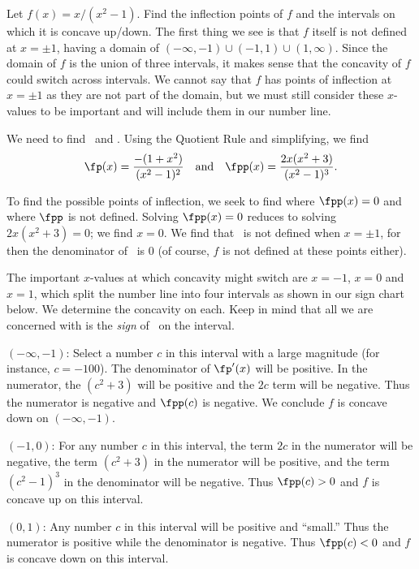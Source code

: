 \begin{example}\label{ex_conc2}
Let $f(x)=x/(x^2-1)$. Find the inflection points of $f$ and the intervals on which it is concave up/down.
\solution
The first thing we see is that $f$ itself is not defined at $x=\pm1$, having a domain of $(-\infty,-1)\cup(-1,1)\cup(1,\infty)$. Since the domain of $f$ is the union of three intervals, it makes sense that the concavity of $f$ could switch across intervals. We cannot say that $f$ has points of inflection at $x=\pm1$ as they are not part of the domain, but we must still consider these $x$-values to be important and will include them in our number line.

We need to find \fp\ and \fpp. Using the Quotient Rule and simplifying, we find
\[
\fp(x)=\frac{-(1+x^2)}{(x^2-1)^2}
\quad \text{and}\quad
\fpp(x) = \frac{2x(x^2+3)}{(x^2-1)^3}.
\]

To find the possible points of inflection, we seek to find where $\fpp(x)=0$ and where $\fpp$ is not defined. Solving $\fpp(x)=0$ reduces to solving $2x(x^2+3)=0$; we find $x=0$.  We find that \fpp\ is not defined when $x=\pm 1$, for then the denominator of \fpp\ is 0 (of course, $f$ is not defined at these points either).

The important $x$-values at which concavity might switch are $x=-1$, $x=0$ and $x=1$, which  split the number line into four intervals as shown in our sign chart below. We determine the concavity on each. Keep in mind that all we are concerned with is the \emph{sign} of \fpp\ on the interval.\bigskip

\begin{description}[leftmargin=0pt]
\item[Interval 1,] $(-\infty,-1)$: Select a number $c$ in this interval with a large magnitude (for instance, $c=-100$). The denominator of $\fp'(x)$ will be positive. In the numerator, the $(c^2+3)$ will be positive and the $2c$ term will be negative. Thus the numerator is negative and $\fpp(c)$ is negative. We conclude $f$ is concave down on $(-\infty,-1)$.

\item[Interval 2,] $(-1,0)$: For any number $c$ in this interval, the term $2c$ in the numerator will be negative, the term $(c^2+3)$ in the numerator will be positive, and the term $(c^2-1)^3$ in the denominator will be negative. Thus $\fpp(c)>0$ and $f$ is concave up on this interval.

\item[Interval 3,] $(0,1)$: Any number $c$ in this interval will be positive and ``small.'' Thus the numerator is positive while the denominator is negative. Thus $\fpp(c)<0$ and $f$ is concave down on this interval.


\end{description}
\end{example}
